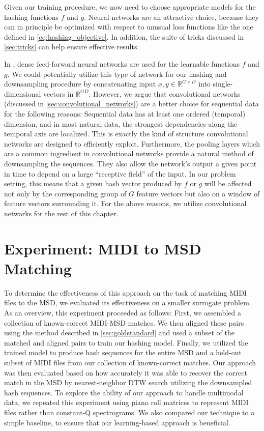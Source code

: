 Given our training procedure, we now need to choose appropriate models for the hashing functions $f$ and $g$.
Neural networks are an attractive choice, because they can in principle be optimized with respect to unusual loss functions like the one defined in \cref{eq:hashing_objective}.
In addition, the suite of tricks discussed in \cref{sec:tricks} can help ensure effective results.

In \cite{masci2014multimodal}, dense feed-forward neural networks are used for the learnable functions $f$ and $g$.
We could potentially utilize this type of network for our hashing and downsampling procedure by concatenating input $x, y \in \mathbb{R}^{G \times D}$ into single-dimensional vectors in $\mathbb{R}^{GD}$.
However, we argue that convolutional networks (discussed in \cref{sec:convolutional_networks}) are a better choice for sequential data for the following reasons:
Sequential data has at least one ordered (temporal) dimension, and in most natural data, the strongest dependencies along the temporal axis are localized.
This is exactly the kind of structure convolutional networks are designed to efficiently exploit.
Furthermore, the pooling layers which are a common ingredient in convolutional networks provide a natural method of downsampling the sequences.
They also allow the network's output a given point in time to depend on a large ``receptive field'' of the input.
In our problem setting, this means that a given hash vector produced by $f$ or $g$ will be affected not only by the corresponding group of $G$ feature vectors but also on a window of feature vectors surrounding it.
For the above reasons, we utilize convolutional networks for the rest of this chapter.

\section{Experiment: MIDI to MSD Matching}
\label{sec:dhs_experiment}

To determine the effectiveness of this approach on the task of matching MIDI files to the MSD, we evaluated its effectiveness on a smaller surrogate problem.
As an overview, this experiment proceeded as follows:
First, we assembled a collection of known-correct MIDI-MSD matches.
We then aligned these pairs using the method described in \cref{sec:goldstandard} and used a subset of the matched and aligned pairs to train our hashing model.
Finally, we utilized the trained model to produce hash sequences for the entire MSD and a held-out subset of MIDI files from our collection of known-correct matches.
Our approach was then evaluated based on how accurately it was able to recover the correct match in the MSD by nearest-neighbor DTW search utilizing the downsampled hash sequences.
To explore the ability of our approach to handle multimodal data, we repeated this experiment using piano roll matrices to represent MIDI files rather than constant-Q spectrograms.
We also compared our technique to a simple baseline, to ensure that our learning-based approach is beneficial.


